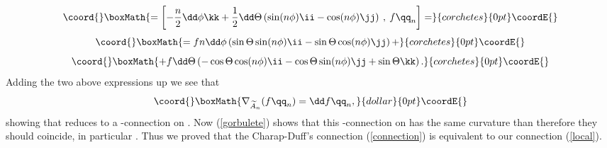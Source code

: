 \documentclass[a4paper,12pt,draft]{article}
\begin{document}
\[\coord{}\boxMath{=\left[-{n\over 2}\dd\phi\kk +{1\over 2}\dd\Theta \left(\sin(n \phi)\ii
-\cos(n \phi)\jj\right)\:,\:f\qq_n \right]=}{corchetes}{0pt}\coordE{}\] 
\[\coord{}\boxMath{ =fn\dd\phi\left(\sin\Theta\sin(n\phi)\ii - 
\sin\Theta\cos(n \phi)\jj\right)+ }{corchetes}{0pt}\coordE{}\]
\[\coord{}\boxMath{+f\dd\Theta\left(-\cos\Theta\cos (n\phi)\ii-\cos\Theta\sin (n\phi)\jj + 
\sin\Theta\kk\right).}{corchetes}{0pt}\coordE{}\] 
Adding the two above expressions up we see that 
$$\coord{}\boxMath{ \nabla_{\widetilde{A}_n} (f \qq_n)= \dd f \qq_n, }{dollar}{0pt}\coordE{}$$
showing that \coordHE{} reduces to a \coordHE{}-connection on 
\coordHE{}. Now (\ref{gorbulete}) shows that 
this \coordHE{}-connection on \coordHE{} has the
same curvature than \coordHE{} therefore they should coincide, in particular 
\coordHE{}. Thus we proved that the Charap-Duff's connection 
(\ref{connection}) is equivalent to our connection (\ref{local}).
\end{document}
